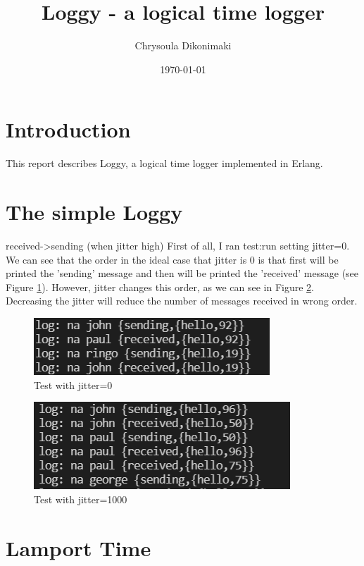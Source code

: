 \documentclass[a4paper, 11pt]{article}
\title{Loggy - a logical time logger}
\author{Chrysoula Dikonimaki}
\date{\today{}}
\begin{document}
\maketitle

\section{Introduction}

This report describes Loggy, a logical time logger implemented in Erlang.

\section{The simple Loggy}
received->sending (when jitter high)
First of all, I ran test:run setting jitter=0. We can see that the order in the ideal case that jitter is 0 is that first will be printed the 'sending' message and then will be printed the 'received' message (see Figure \ref{exp1}).
However, jitter changes this order, as we can see in Figure \ref{exp2}. Decreasing the jitter will reduce the number of messages received in wrong order.

\begin{figure}
  \begin{center}
    \includegraphics[scale=0.5]{exp1.PNG}
    \caption{Test with jitter=0}
    \label{exp1}
  \end{center}
\end{figure}

\begin{figure}
  \begin{center}
    \includegraphics[scale=0.4]{exp2.PNG}
    \caption{Test with jitter=1000}
    \label{exp2}
  \end{center}
\end{figure}

\section{Lamport Time}
\end{document}
